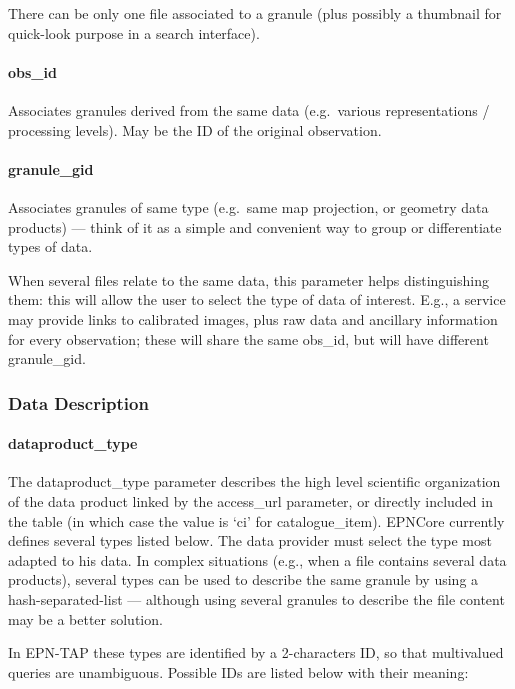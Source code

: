 \documentclass[11pt,a4paper]{ivoa}
\begin{document}
There can be only one file associated to a granule (plus possibly a
thumbnail for quick-look purpose in a search interface).

\paragraph{obs\_id}

Associates granules derived from the same data (e.g.\ various
representations / processing levels). May be the ID of the original
observation.

\paragraph{granule\_gid}

Associates granules of same type (e.g.\ same map projection, or geometry
data products) --- think of it as a simple and convenient way to group or
differentiate types of data.

When several files relate to the same data, this parameter helps
distinguishing them: this will allow the user to select the type of data
of interest. E.g., a service may provide links to calibrated images,
plus raw data and ancillary information for every observation; these
will share the same obs\_id, but will have different granule\_gid.

\subsubsection{Data Description}

\paragraph{dataproduct\_type}

The dataproduct\_type parameter describes the high level scientific
organization of the data product linked by the access\_url parameter,
or directly included in the table (in which case the value is `ci'
for catalogue\_item). EPNCore currently defines several types listed
below. The data provider must select the type most adapted to his
data. In complex situations (e.g., when a file contains several data
products), several types can be used to describe the same granule by
using a hash-separated-list — although using several granules to
describe the file content may be a better solution.

In EPN-TAP these types are identified by a 2-characters ID, so that
multivalued queries are unambiguous. Possible IDs are listed below with
their meaning:
\end{document}
